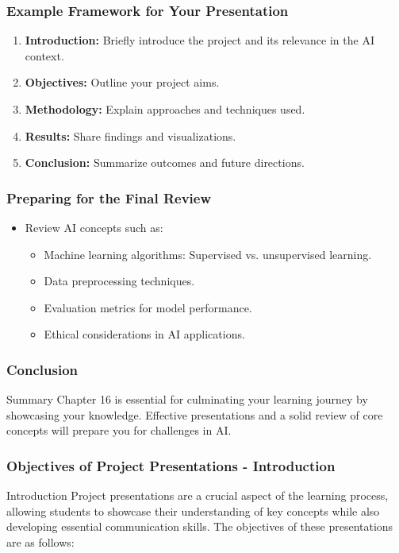\documentclass[aspectratio=169]{beamer}
\begin{document}
\begin{frame}[fragile]
    \frametitle{Example Framework for Your Presentation}
    \begin{enumerate}
        \item \textbf{Introduction:} Briefly introduce the project and its relevance in the AI context.
        \item \textbf{Objectives:} Outline your project aims.
        \item \textbf{Methodology:} Explain approaches and techniques used.
        \item \textbf{Results:} Share findings and visualizations.
        \item \textbf{Conclusion:} Summarize outcomes and future directions.
    \end{enumerate}
\end{frame}

\begin{frame}[fragile]
    \frametitle{Preparing for the Final Review}
    \begin{itemize}
        \item Review AI concepts such as:
        \begin{itemize}
            \item Machine learning algorithms: Supervised vs. unsupervised learning.
            \item Data preprocessing techniques.
            \item Evaluation metrics for model performance.
            \item Ethical considerations in AI applications.
        \end{itemize}
    \end{itemize}
\end{frame}

\begin{frame}[fragile]
    \frametitle{Conclusion}
    \begin{block}{Summary}
        Chapter 16 is essential for culminating your learning journey by showcasing your knowledge.
        Effective presentations and a solid review of core concepts will prepare you for challenges in AI.
    \end{block}
\end{frame}

\begin{frame}[fragile]
    \frametitle{Objectives of Project Presentations - Introduction}
    \begin{block}{Introduction}
        Project presentations are a crucial aspect of the learning process, allowing students to showcase their understanding of key concepts while also developing essential communication skills. The objectives of these presentations are as follows:
    \end{block}
\end{frame}
\end{document}
